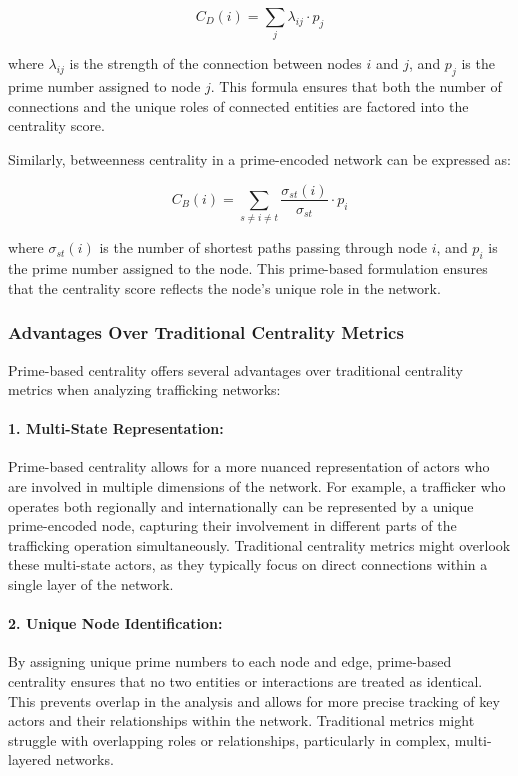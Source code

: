 \documentclass[%
 preprint, linenumbers,
 amsmath,amssymb,
 aps, physrev,
]{revtex4-2}
\begin{document}
\[
C_D(i) = \sum_{j} \lambda_{ij} \cdot p_j
\]

where \(\lambda_{ij}\) is the strength of the connection between nodes \(i\) and \(j\), and \(p_j\) is the prime number assigned to node \(j\). This formula ensures that both the number of connections and the unique roles of connected entities are factored into the centrality score.

Similarly, betweenness centrality in a prime-encoded network can be expressed as:

\[
C_B(i) = \sum_{s \neq i \neq t} \frac{\sigma_{st}(i)}{\sigma_{st}} \cdot p_i
\]

where \(\sigma_{st}(i)\) is the number of shortest paths passing through node \(i\), and \(p_i\) is the prime number assigned to the node. This prime-based formulation ensures that the centrality score reflects the node’s unique role in the network.

\subsubsection{Advantages Over Traditional Centrality Metrics}

Prime-based centrality offers several advantages over traditional centrality metrics when analyzing trafficking networks:

\paragraph{1. Multi-State Representation:}
Prime-based centrality allows for a more nuanced representation of actors who are involved in multiple dimensions of the network. For example, a trafficker who operates both regionally and internationally can be represented by a unique prime-encoded node, capturing their involvement in different parts of the trafficking operation simultaneously. Traditional centrality metrics might overlook these multi-state actors, as they typically focus on direct connections within a single layer of the network.

\paragraph{2. Unique Node Identification:}
By assigning unique prime numbers to each node and edge, prime-based centrality ensures that no two entities or interactions are treated as identical. This prevents overlap in the analysis and allows for more precise tracking of key actors and their relationships within the network. Traditional metrics might struggle with overlapping roles or relationships, particularly in complex, multi-layered networks.
\end{document}
